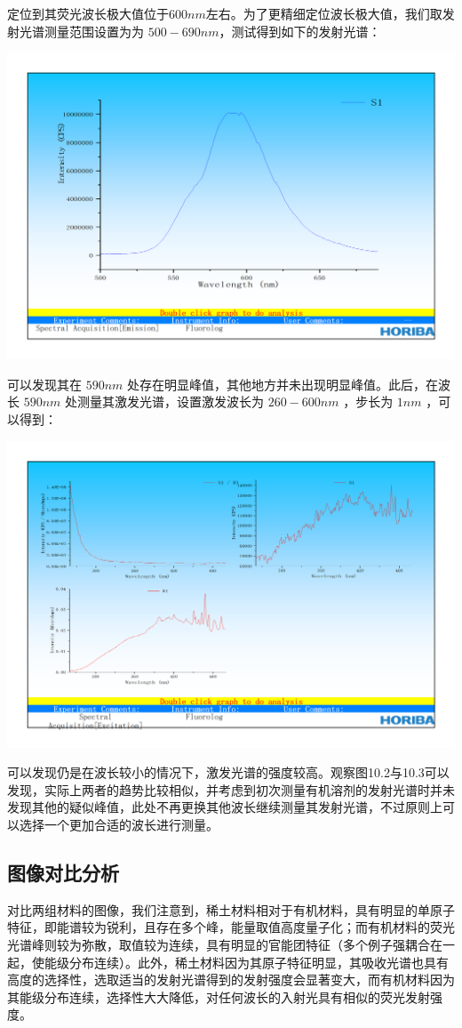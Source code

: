 \documentclass[hyperref]{ctexart}
\begin{document}
\begin{multicols}{2}
		定位到其荧光波长极大值位于$600nm$左右。为了更精细定位波长极大值，我们取发射光谱测量范围设置为为 $500-690nm$，测试得到如下的发射光谱：
		
		\includegraphics[width = 0.75\linewidth]{OR_Emission_Spectroscopy_500-690_350.png}
		
		可以发现其在 $590nm$ 处存在明显峰值，其他地方并未出现明显峰值。此后，在波长 $590nm$ 处测量其激发光谱，设置激发波长为 $260-600nm$ ，步长为 $1nm$ ，可以得到：
		
		\includegraphics[width = 0.75\linewidth]{OR_Emission_Spectroscopy_590_260-600.png}
		
		可以发现仍是在波长较小的情况下，激发光谱的强度较高。观察图10.2与10.3可以发现，实际上两者的趋势比较相似，并考虑到初次测量有机溶剂的发射光谱时并未发现其他的疑似峰值，此处不再更换其他波长继续测量其发射光谱，不过原则上可以选择一个更加合适的波长进行测量。
		
		\subsection{图像对比分析}
		对比两组材料的图像，我们注意到，稀土材料相对于有机材料，具有明显的单原子特征，即能谱较为锐利，且存在多个峰，能量取值高度量子化；而有机材料的荧光光谱峰则较为弥散，取值较为连续，具有明显的官能团特征（多个例子强耦合在一起，使能级分布连续）。此外，稀土材料因为其原子特征明显，其吸收光谱也具有高度的选择性，选取适当的发射光谱得到的发射强度会显著变大，而有机材料因为其能级分布连续，选择性大大降低，对任何波长的入射光具有相似的荧光发射强度。
		

\end{multicols}
\end{document}
